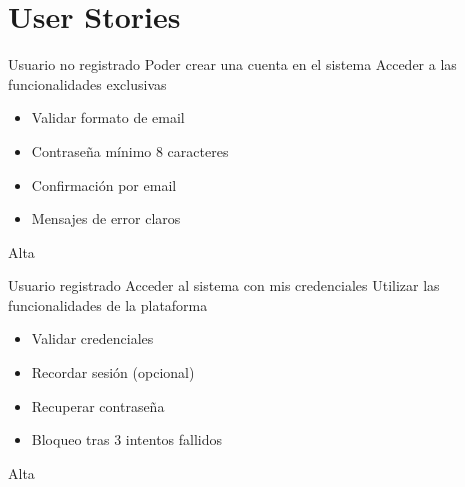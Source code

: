 \section{User Stories}
{Usuario no registrado}
{Poder crear una cuenta en el sistema}
{Acceder a las funcionalidades exclusivas}
{\begin{itemize}[leftmargin=*]
\item Validar formato de email
\item Contraseña mínimo 8 caracteres
\item Confirmación por email
\item Mensajes de error claros
\end{itemize}}
{Alta}

{Usuario registrado}
{Acceder al sistema con mis credenciales}
{Utilizar las funcionalidades de la plataforma}
{\begin{itemize}[leftmargin=*]
\item Validar credenciales
\item Recordar sesión (opcional)
\item Recuperar contraseña
\item Bloqueo tras 3 intentos fallidos
\end{itemize}}
{Alta}
